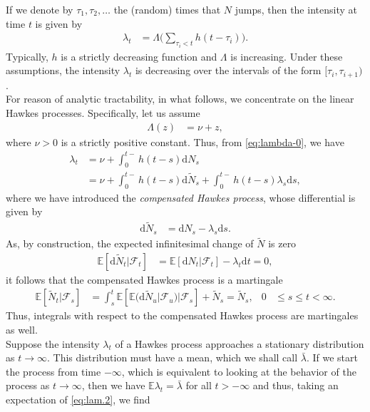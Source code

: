 \documentclass[12pt]{book}
\numberwithin{equation}{chapter}
\theoremstyle{plain}
\numberwithin{theorem}{section}
\theoremstyle{definition}
\numberwithin{exercise}{chapter}
\newcommand{\<}{\langle}
\renewcommand{\>}{\rangle}
\renewcommand{\(}{\left(}
\renewcommand{\)}{\right)}
\renewcommand{\[}{\left[}
\renewcommand{\]}{\right]}
\newcommand\Eb{\mathds{E}}
\newcommand\Fc{\mathscr{F}}
\newcommand\Lam{\Lambda}
\newcommand\lam{\lambda}
\newcommand\Nt{\widetilde{N}}
\newcommand\dd{\mathrm{d}}
\begin{document}
\noindent
If we denote by $\tau_1, \tau_2, \ldots $ the (random) times that $N$ jumps, then the intensity at time $t$ is given by
\begin{align}
\lam_t
	&=	\Lam \Big( \sum_{\tau_i < t} h(t - \tau_i) \Big) .
\end{align}
Typically, $h$ is a strictly decreasing function and $\Lam$ is increasing.  Under these assumptions, the intensity $\lam_t$ is decreasing over the intervals of the form $[\tau_i,\tau_{i+1})$.
\\[0.5em]
For reason of analytic tractability, in what follows, we concentrate on the linear Hawkes processes.
Specifically, let us assume 
\begin{align}
\Lam(z)
	&=	\nu + z ,
\end{align}
where $\nu > 0$ is a strictly positive constant.
Thus, from \eqref{eq:lambda-0}, we have
\begin{align}
\lambda_t
	&=	\nu + \int_0^{t-}h(t-s) \dd N_s \label{eq:lam.1} \\
	&=	\nu + \int_0^{t-}h(t-s) \dd \Nt_s + \int_0^{t-}h(t-s) \lam_s \dd s , \label{eq:lam.2}
\end{align}
where we have introduced the \emph{compensated Hawkes process}, whose differential is given by
\begin{align}
\dd \Nt_s
	&=	\dd N_s - \lam_s \dd s .
\end{align}
As, by construction, the expected infinitesimal change of $\Nt$ is zero
\begin{align}
\Eb[ \dd \Nt_t | \Fc_t] 
	&= \Eb[ \dd N_t | \Fc_t] - \lam_t \dd t = 0 ,
\end{align}
 it follows that the compensated Hawkes process is a martingale
\begin{align}
\Eb [ \Nt_t | \Fc_s ]
	&=	\int_s^t \Eb[ \Eb( \dd \Nt_u | \Fc_u ) | \Fc_s ] + \Nt_s
	 =	\Nt_s , &
0
	&\leq s \leq t < \infty .
\end{align}
Thus, integrals with respect to the compensated Hawkes process are martingales as well.
\\[0.5em]
Suppose the intensity $\lam_t$ of a Hawkes process approaches a stationary distribution as $t \to \infty$.  This distribution must have a mean, which we shall call $\bar{\lam}$.  If we start the process from time $-\infty$, which is equivalent to looking at the behavior of the process as $t \to \infty$, then we have $\Eb \lam_t = \bar{\lam}$ for all $t>-\infty$ and thus, taking an expectation of \eqref{eq:lam.2}, we find
\end{document}

